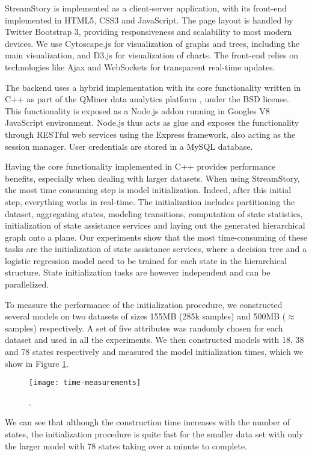 StreamStory is implemented as a client-server application, with its front-end implemented in HTML5,
CSS3 and JavaScript. The page layout is handled by Twitter Bootstrap 3, providing 
responsiveness and scalability to most modern devices. We use Cytoscape.js
for visualization of graphs and trees, including the main visualization, and D3.js for visualization of charts.
The front-end relies on technologies like Ajax and WebSockets for transparent real-time
updates.

The backend uses a hybrid implementation with its core functionality written in C++
as part of the QMiner data analytics platform \cite{qminer}, under the BSD license.
This functionality is exposed as a Node.js addon running in Googles V8 JavaScript
environment. Node.js thus acts as glue and exposes the functionality through RESTful
web services using the Express framework, also acting as the session manager.
User credentials  are stored in a MySQL database.

Having the core functionality implemented in C++ provides performance benefits, especially
when dealing with larger datasets. When using StreamStory, the most time consuming step
is model initialization. Indeed, after this initial step, everything works in real-time.
The initialization includes partitioning the dataset, aggregating states, modeling transitions,
computation of state statistics, initialization of state assistance services and laying out the generated
hierarchical graph onto a plane. Our experiments show that the most time-consuming of these tasks are
the initialization of state assistance services, where a decision tree and a logistic regression
model need to be trained for each state in the hierarchical structure. State initialization tasks
are however independent and can be parallelized.

To measure the performance of the initialization procedure, we constructed several models on two datasets
of sizes 155MB (285k samples) and 500MB ($\approx$  samples) respectively. A set of five attributes
was randomly chosen for each dataset and used in all the experiments. We
then constructed models with 18, 38 and 78 states respectively and measured the model initialization times,
which we show in Figure \ref{fig:performance}.
\begin{figure}[h!]
	\centering
	\texttt{[image: time-measurements]}
	\caption{\lstopar{[TODO]}.}
	\label{fig:performance}
\end{figure}
We can see that although the construction time increases with the number of states, the initialization
procedure is quite fast for the smaller data set with only the larger model with 78 states taking over 
a minute to complete. 

